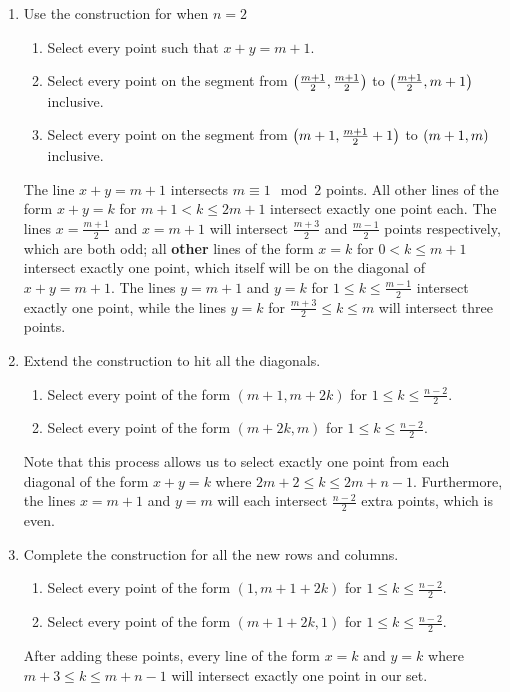 \documentclass[10pt]{../usamts}
\begin{document}
\begin{solution}
\begin{enumerate}
    \item Use the construction for when $n=2$
    \begin{enumerate}
        \item Select every point such that $x+y = m+1$.
        \item Select every point on the segment from $\left( \frac{m+1}{2}, \frac{m+1}{2} \right)$ to $\left( \frac{m+1}{2}, m+1 \right)$ inclusive.
        \item Select every point on the segment from $\left( m+1, \frac{m+1}{2}+1 \right)$ to $\left( m+1, m \right)$ inclusive.
    \end{enumerate}
    The line $x+y=m+1$ intersects $m \equiv 1 \mod 2$ points. All other lines of the form $x+y=k$ for $m+1 < k \leq 2m+1$ intersect exactly one point each. The lines $x=\frac{m+1}{2}$ and $x=m+1$ will intersect $\frac{m+3}{2}$ and $\frac{m-1}{2}$ points respectively, which are both odd; all \textbf{other} lines of the form $x=k$ for $0 < k \leq m+1$ intersect exactly one point, which itself will be on the diagonal of $x+y=m+1$. The lines $y=m+1$ and $y=k$ for $1 \leq k \leq \frac{m-1}{2}$ intersect exactly one point, while the lines $y=k$ for $\frac{m+3}{2} \leq k \leq m$ will intersect three points.
    \item Extend the construction to hit all the diagonals.
    \begin{enumerate}
        \item Select every point of the form $(m+1, m+2k)$ for $1 \leq k \leq \frac{n-2}{2}$.
        \item Select every point of the form $(m+2k, m)$ for $1 \leq k \leq \frac{n-2}{2}$.
    \end{enumerate}
    Note that this process allows us to select exactly one point from each diagonal of the form $x+y=k$ where $2m+2 \leq k \leq 2m+n-1$.
    Furthermore, the lines $x=m+1$ and $y=m$ will each intersect $\frac{n-2}{2}$ extra points, which is even.
    \item Complete the construction for all the new rows and columns.
    \begin{enumerate}
        \item Select every point of the form $(1, m+1+2k)$ for $1 \leq k \leq \frac{n-2}{2}$.
        \item Select every point of the form $(m+1+2k, 1)$ for $1 \leq k \leq \frac{n-2}{2}$.
    \end{enumerate}
    After adding these points, every line of the form $x=k$ and $y=k$ where $m+3 \leq k \leq m+n-1$ will intersect exactly one point in our set.
    

\end{enumerate}
\end{solution}
\end{document}
